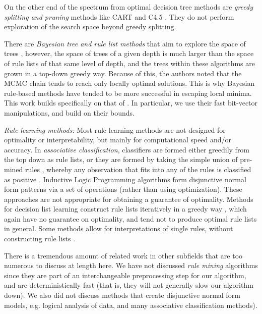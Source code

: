 \documentclass[aoas,preprint]{imsart}
\begin{document}
On the other end of the spectrum from optimal decision tree methods are \textit{greedy splitting and pruning} methods like CART \cite{} and C4.5 \cite{}. They do not perform exploration of the search space beyond greedy splitting.

There are \textit{Bayesian tree and rule list methods} that aim to explore the space of trees \cite{Dension:1998hl,Chipman:2002hc,Chipman10}, however, the space of trees of a given depth is much larger than the space of rule lists of that same level of depth, and the trees within these algorithms are grown in a top-down greedy way. Because of this, the authors noted that the MCMC chain tends to reach only locally optimal solutions. This is why Bayesian rule-based methods \citep{LethamRuMcMa15,YangRuSe16} have tended to be more successful in escaping local minima. This work builds specifically on that of \citet{YangRuSe16}. In particular, we use their fast bit-vector manipulations, and build on their bounds. 

\textit{Rule learning methods:} 
Most rule learning methods are not designed for optimality or interpretability, but mainly for computational speed and/or accuracy. In \textit{associative classification}, classifiers are formed either greedily from the top down as rule lists, \cite{Vanhoof10,Liu98,Li01,Yin03} or they are formed by taking the simple union of pre-mined rules \cite{??}, whereby any observation that fits into any of the rules is classified as positive \cite{??}. Inductive Logic Programming \cite{muggleton1994inductive} algorithms form disjunctive normal form patterns via a set of operations (rather than using optimization). These approaches are not appropriate for obtaining a guarantee of optimality. Methods for decision list learning construct rule lists iteratively in a greedy way
\cite{Rivest87,Sokolova03,Anthony05,Marchand05,RudinLeMa13,Goessling2015}, which again have no guarantee on optimality, and tend not to produce optimal rule lists in general. Some methods allow for interpretations of single rules, without constructing rule lists \citep{McCormick:2011ws}.

There is a tremendous amount of related work in other subfields that are too numerous to discuss at length here. We have not discussed \textit{rule mining} algorithms since they are part of an interchangeable preprocessing step for our algorithm, and are deterministically fast (that is, they will not generally slow our algorithm down). We also did not discuss methods that create disjunctive normal form models, e.g. logical analysis of data, and many associative classification methods). 
\end{document}
